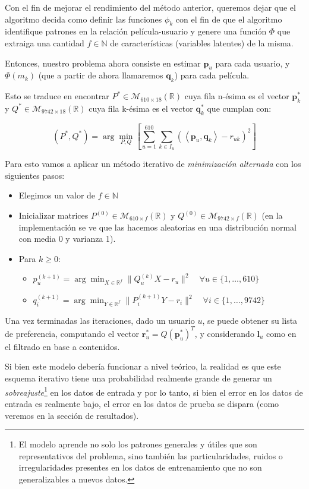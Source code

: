 \documentclass[12pt,a4paper]{article}
\begin{document}
Con el fin de mejorar el rendimiento del método anterior, queremos dejar que el algoritmo decida como definir las funciones \(\phi_k\) con el fin de que el algoritmo identifique patrones en la relación película-usuario y genere una función \(\Phi\) que extraiga una cantidad \(f \in \mathbb{N}\) de características (variables latentes) de la misma.


Entonces, nuestro problema ahora consiste en estimar \(\mathbf{p}_u\) para cada usuario, y \(\Phi(m_k)\) (que a partir de ahora llamaremos \(\mathbf{q}_k\)) para cada película.

Esto se traduce en encontrar \(P^* \in \mathcal{M}_{610\times18}(\mathbb{R})\) cuya fila n-ésima es el vector \(\mathbf{p}^*_k\) y \(Q^* \in \mathcal{M}_{9742\times18}(\mathbb{R})\) cuya fila k-ésima es el vector \(\mathbf{q}^*_k\) que cumplan con:

\[
  (P^*, Q^*) = \arg\min_{P, Q}  \left[\sum_{u=1}^{610} \sum_{k \in I_u} (\left\langle \mathbf{p}_u, \mathbf{q}_k \right\rangle - r_{uk})^2 \right]
\]

Para esto vamos a aplicar un método iterativo de \textit{minimización alternada} con los siguientes pasos:

\begin{itemize}
  \item Elegimos un valor de \(f \in \mathbb{N}\)
  \item Inicializar matrices \( P^{(0)} \in \mathcal{M}_{610 \times f}(\mathbb{R}) \) y \( Q^{(0)} \in \mathcal{M}_{9742 \times f}(\mathbb{R}) \) (en la implementación se ve que las hacemos aleatorias en una distribución normal con media 0 y varianza 1).
  \item Para \( k \geq 0 \):
        \begin{itemize}
          \item \( p_u^{(k+1)} = \arg\min_{X \in \mathbb{R}^f} \| Q_u^{(k)} X - r_u \|^2 \quad \forall u \in \{1, \dots, 610\} \)
          \item \( q_i^{(k+1)} = \arg\min_{Y \in \mathbb{R}^f} \| P_i^{(k+1)} Y - r_i \|^2 \quad \forall i \in \{1, \dots, 9742\} \)
        \end{itemize}
\end{itemize}

Una vez terminadas las iteraciones, dado un usuario \(u\), se puede obtener su lista de preferencia, computando el vector \(\mathbf{r}^*_u = Q (\mathbf{p}^{*}_u)^T\), y considerando \(\mathbf{l}_u\) como en el filtrado en base a contenidos.

Si bien este modelo debería funcionar a nivel teórico, la realidad es que este esquema iterativo tiene una probabilidad realmente grande de generar un \textit{sobreajuste}\footnote{El modelo aprende no solo los patrones generales y útiles que son representativos del problema, sino también las particularidades, ruidos o irregularidades presentes en los datos de entrenamiento que no son generalizables a nuevos datos.} en los datos de entrada y por lo tanto, si bien el error en los datos de entrada es realmente bajo, el error en los datos de prueba se dispara (como veremos en la sección de resultados).
\end{document}
